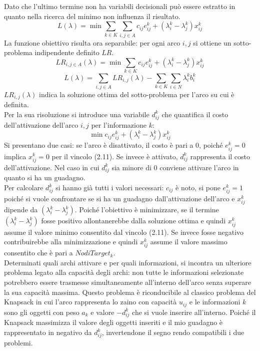 \documentclass[12pt,a4paper,twoside]{report}
\begin{document}
	Dato che l'ultimo termine non ha variabili decisionali può essere estratto in quanto nella ricerca del minimo non influenza il risultato.
	\begin{equation}
		L(\lambda)= \min \sum_{k \in K}\sum_{i,j \in A} c_{ij}e^k_{ij}+(\lambda^k_i-\lambda^k_j)x^k_{ij}
	\end{equation}
	La funzione obiettivo risulta ora separabile: per ogni arco $i,j$ si ottiene un sotto-problema indipendente definito $LR$.
	\begin{equation}
		LR_{i,j \in A}(\lambda)=\min \sum_{k \in K}c_{ij}e^k_{ij}+(\lambda^k_i-\lambda^k_j)x^k_{ij}
	\end{equation}
	\begin{equation}
		L(\lambda)=\sum_{i,j \in A} LR_{i,j}(\lambda)-\sum_{k \in K}\sum_{i \in N}\lambda^k_i b^k_i
	\end{equation}
	$LR_{i,j}(\lambda)$ indica la soluzione ottima del sotto-problema per l'arco su cui è definita.\\
	Per la sua risoluzione si introduce una variabile $d^k_{ij}$ che quantifica il costo dell'attivazione dell'arco $i,j$ per l'informazione $k$:
	\begin{equation}
		\min c_{ij}e^k_{ij}+(\lambda^k_i-\lambda^k_j)x^k_{ij}
	\end{equation}
	Si presentano due casi: se l'arco è disattivato, il costo è pari a 0, poiché $e^k_{ij}=0$ implica $x^k_{ij}=0$ per il vincolo (2.11).
	Se invece è attivato, $d^k_{ij}$ rappresenta il costo dell'attivazione. Nel caso in cui $d^k_{ij}$ sia minore di 0 conviene attivare l'arco in quanto si ha un guadagno. \smallskip \\
	Per calcolare $d^k_{ij}$ si hanno già tutti i valori necessari: $c_{ij}$ è noto, si pone $e^k_{ij}=1$ poiché si vuole confrontare se si ha un guadagno dall'attivazione dell'arco e
	$x^k_{ij}$ dipende da $(\lambda^k_i-\lambda^k_j)$. Poiché l'obiettivo è minimizzare, se il termine $(\lambda^k_i-\lambda^k_j)$ fosse positivo allontanerebbe dalla soluzione ottima e quindi $x^k_{ij}$ assume il valore minimo consentito dal vincolo (2.11). Se invece fosse negativo contribuirebbe alla minimizzazione e quindi $x^k_{ij}$ assume il valore massimo consentito che è pari a $NodiTarget_k$. \smallskip \\
	Determinati quali archi attivare e per quali informazioni, si incontra un ulteriore problema legato alla capacità degli archi: non tutte le informazioni selezionate potrebbero essere trasmesse simultaneamente all'interno dell'arco senza superare la sua capacità massima.
	Questo problema è riconducibile al classico problema del Knapsack in cui l'arco rappresenta lo zaino con capacità $u_{ij}$ e le informazioni $k$ sono gli oggetti con peso $a_k$ e valore $-d^k_{ij}$ che si vuole inserire all'interno.
	Poiché il Knapsack massimizza il valore degli oggetti inseriti e il mio guadagno è rappresentato in negativo da $d^k_{ij}$, invertendone il segno rendo compatibili i due problemi.
\end{document}
